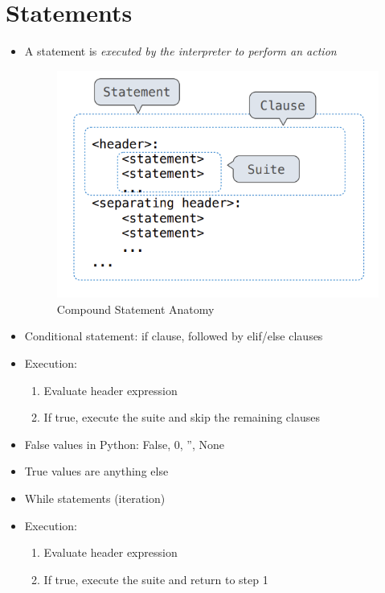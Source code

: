 \section{Statements}
\begin{itemize}
	\item A statement is \emph{executed by the interpreter to perform an action}
	\medskip
	\begin{figure}[H]
	\includegraphics[width=0.5\linewidth]{figures/compound_statement.png}
	\caption{Compound Statement Anatomy}
	\end{figure}
	\item Conditional statement: if clause, followed by elif/else clauses
	\item Execution:
	\begin{enumerate}
		\item Evaluate header expression
		\item If true, execute the suite and skip the remaining clauses
	\end{enumerate}
	\item False values in Python: False, 0, '', None
	\item True values are anything else
	\item While statements (iteration)
	\item Execution:
	\begin{enumerate}
		\item Evaluate header expression
		\item If true, execute the suite and return to step 1
	\end{enumerate}
\end{itemize}